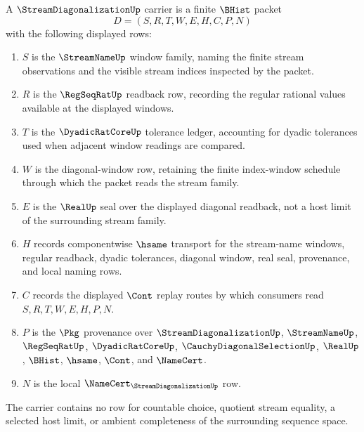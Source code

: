 \begin{definition}
\label{def:stream-diagonalization-carrier}
A $\StreamDiagonalizationUp$ carrier is a finite $\BHist$ packet
$$
D=(S,R,T,W,E,H,C,P,N)
$$
with the following displayed rows:
\begin{enumerate}
\item $S$ is the $\StreamNameUp$ window family, naming the finite stream observations and the visible stream indices inspected by the packet.
\item $R$ is the $\RegSeqRatUp$ readback row, recording the regular rational values available at the displayed windows.
\item $T$ is the $\DyadicRatCoreUp$ tolerance ledger, accounting for dyadic tolerances used when adjacent window readings are compared.
\item $W$ is the diagonal-window row, retaining the finite index-window schedule through which the packet reads the stream family.
\item $E$ is the $\RealUp$ seal over the displayed diagonal readback, not a host limit of the surrounding stream family.
\item $H$ records componentwise $\hsame$ transport for the stream-name windows, regular readback, dyadic tolerances, diagonal window, real seal, provenance, and local naming rows.
\item $C$ records the displayed $\Cont$ replay routes by which consumers read $S,R,T,W,E,H,P,N$.
\item $P$ is the $\Pkg$ provenance over $\StreamDiagonalizationUp$, $\StreamNameUp$, $\RegSeqRatUp$, $\DyadicRatCoreUp$, $\CauchyDiagonalSelectionUp$, $\RealUp$, $\BHist$, $\hsame$, $\Cont$, and $\NameCert$.
\item $N$ is the local $\NameCert_{\StreamDiagonalizationUp}$ row.
\end{enumerate}
The carrier contains no row for countable choice, quotient stream equality, a selected host limit, or ambient completeness of the surrounding sequence space.
\end{definition}

